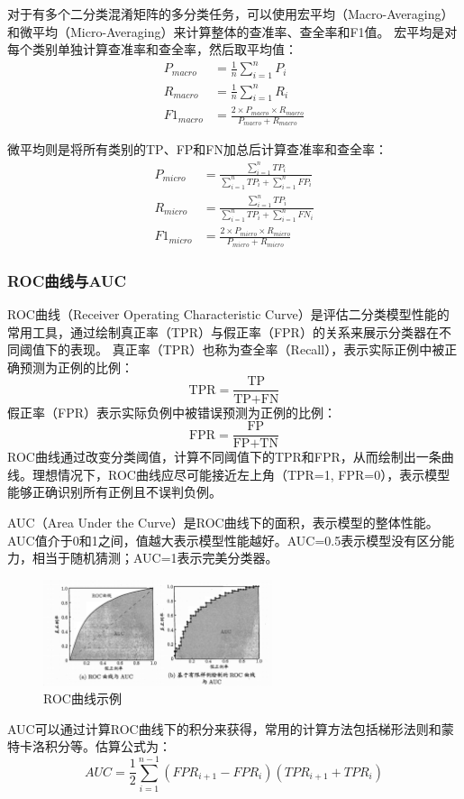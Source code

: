 对于有多个二分类混淆矩阵的多分类任务，可以使用宏平均（Macro-Averaging）和微平均（Micro-Averaging）来计算整体的查准率、查全率和F1值。
宏平均是对每个类别单独计算查准率和查全率，然后取平均值：
\begin{align}
    P_{macro} &= \frac{1}{n} \sum_{i=1}^{n} P_i \nonumber \\
    R_{macro} &= \frac{1}{n} \sum_{i=1}^{n} R_i \nonumber \\
    F1_{macro} &= \frac{2 \times P_{macro} \times R_{macro}}{P_{macro} + R_{macro}}
\end{align}

微平均则是将所有类别的TP、FP和FN加总后计算查准率和查全率：
\begin{align}
    P_{micro} &= \frac{\sum_{i=1}^{n} TP_i}{\sum_{i=1}^{n} TP_i + \sum_{i=1}^{n} FP_i} \nonumber \\
    R_{micro} &= \frac{\sum_{i=1}^{n} TP_i}{\sum_{i=1}^{n} TP_i + \sum_{i=1}^{n} FN_i} \nonumber \\
    F1_{micro} &= \frac{2 \times P_{micro} \times R_{micro}}{P_{micro} + R_{micro}}
\end{align}
\subsubsection{ROC曲线与AUC}
ROC曲线（Receiver Operating Characteristic Curve）是评估二分类模型性能的常用工具，通过绘制真正率（TPR）与假正率（FPR）的关系来展示分类器在不同阈值下的表现。
真正率（TPR）也称为查全率（Recall），表示实际正例中被正确预测为正例的比例：
\begin{equation}
    \text{TPR} = \frac{\text{TP}}{\text{TP} + \text{FN}}
\end{equation}
假正率（FPR）表示实际负例中被错误预测为正例的比例：
\begin{equation}
    \text{FPR} = \frac{\text{FP}}{\text{FP} + \text{TN}}    
\end{equation}
ROC曲线通过改变分类阈值，计算不同阈值下的TPR和FPR，从而绘制出一条曲线。理想情况下，ROC曲线应尽可能接近左上角（TPR=1, FPR=0），表示模型能够正确识别所有正例且不误判负例。

AUC（Area Under the Curve）是ROC曲线下的面积，表示模型的整体性能。AUC值介于0和1之间，值越大表示模型性能越好。AUC=0.5表示模型没有区分能力，相当于随机猜测；AUC=1表示完美分类器。

\begin{figure}[H]
    \centering
    \includegraphics[width=0.6\textwidth]{static/images/ROC曲线与AUC.png}
    \caption{ROC曲线示例}
    \label{fig:roc_curve}
\end{figure}
AUC可以通过计算ROC曲线下的积分来获得，常用的计算方法包括梯形法则和蒙特卡洛积分等。估算公式为：
\begin{equation}
    AUC = \frac{1}{2} \sum_{i=1}^{n-1} (FPR_{i+1} - FPR_i)(TPR_{i+1} + TPR_i)
\end{equation}


